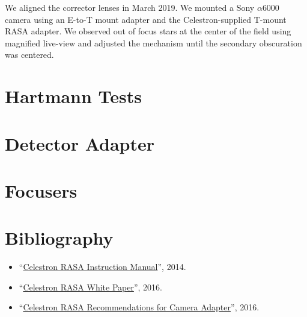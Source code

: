 We aligned the corrector lenses in March 2019. We mounted a Sony $\alpha$6000 camera using an E-to-T mount adapter and the Celestron-supplied T-mount RASA adapter. We observed out of focus stars at the center of the field using magnified live-view and adjusted the mechanism until the secondary obscuration was centered.

\section{Hartmann Tests}

\section{Detector Adapter}

\section{Focusers}

\section*{Bibliography}

\begin{flushleft}
\begin{itemize}
\item “\href{bibliography/celestron-rasa-11-manual.pdf}{Celestron RASA Instruction Manual}”, 2014.
\item “\href{bibliography/celestron-rasa-11-white-paper.pdf}{Celestron RASA White Paper}”, 2016.
\item “\href{bibliography/celestron-rasa-11-camera-adapter.pdf}{Celestron RASA Recommendations for Camera Adapter}”, 2016.
\end{itemize}
\end{flushleft}
